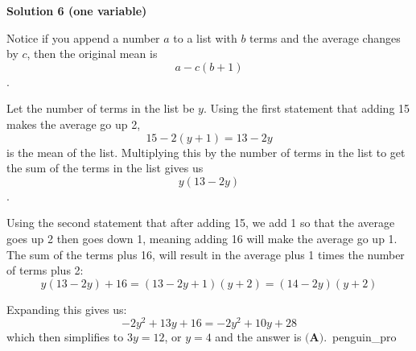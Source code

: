 \begin{enumerate}
 


 



\textbf{Solution 6 (one variable)}

Notice if you append a number $a$ to a list with $b$ terms and the average changes by $c$, then the original mean is 
 \[a-c(b+1)\].

 Let the number of terms in the list be $y$. Using the first statement that adding 15 makes the average go up 2, 
 \[15-2(y+1)=13-2y\] is the mean of the list. Multiplying this by the number of terms in the list to get the sum of the terms in the list gives us 
 \[y(13-2y)\]. 

 Using the second statement that after adding 15, we add 1 so that the average goes up 2 then goes down 1, meaning adding 16 will make the average go up 1. The sum of the terms plus 16, will result in the average plus 1 times the number of terms plus 2:
 \[y(13-2y)+16=(13-2y+1)(y+2)=(14-2y)(y+2)\]

 Expanding this gives us:
 \[-2y^2+13y+16=-2y^2+10y+28\]which then simplifies to $3y=12$, or $y=4$ and the answer is $\textbf{(A)}$.~penguin\_pro

 


\end{enumerate}